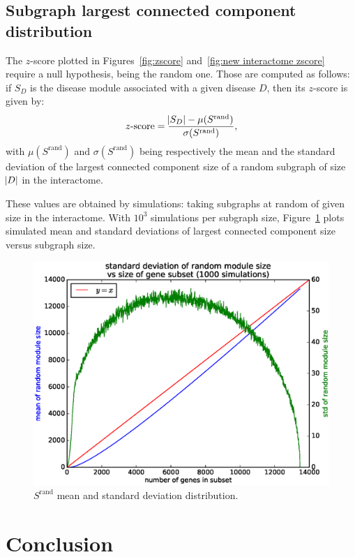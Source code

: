 \documentclass[letterpaper]{article}
\begin{document}
	\subsection{Subgraph largest connected component distribution}
	The $z$-score plotted in Figures~\ref{fig:zscore} and~\ref{fig:new interactome zscore} require a null hypothesis, being the random one.
	Those are computed as follows: if $S_D$ is the disease module associated with a given disease $D$,
	then its $z$-score is given by:
	\begin{equation}
		z\text{-score} = \frac {\abs {S_D} - \mu(S^{\text{rand}})}{\sigma(S^{\text{rand}})},
	\end{equation}
	with $\mu(S^{\text{rand}})$ and $\sigma(S^{\text{rand}})$ being respectively the mean and the
	standard deviation of the largest connected component size of a random subgraph of size $\abs D$
	in the interactome.

	These values are obtained by simulations: taking subgraphs at random of given size in the
	interactome. With $10^3$ simulations per subgraph size, Figure~\ref{fig:Srand distribution}
	plots simulated mean and standard deviations of largest connected component size versus
	subgraph size.

	\begin{figure}[!h]\centering
		\includegraphics[width=.45\textwidth]{images/Srand_distribution_1000_sims.eps}
		\caption{$S^{\text{rand}}$ mean and standard deviation distribution.\label{fig:Srand distribution}}
	\end{figure}


\section{Conclusion}

\footnotesize

{}
\end{document}
